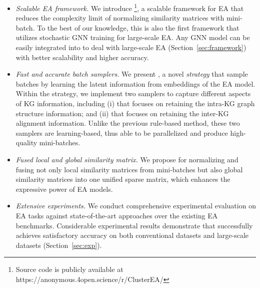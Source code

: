 \begin{itemize}[topsep=0pt,itemsep=0pt,parsep=0pt,partopsep=0pt,leftmargin=*]
    \item{\emph{Scalable EA framework.}}
    We introduce \ClusterEA{}\footnote{Source code is publicly available at https://anonymous.4open.science/r/ClusterEA/}, a scalable framework for EA that reduces the complexity limit of normalizing similarity matrices with mini-batch. To the best of our knowledge, this is also the first framework that utilizes stochastic GNN training for large-scale EA. Any GNN model can be easily integrated into \ClusterEA{} to deal with large-scale EA (Section~\ref{sec:framework}) with better scalability and higher accuracy.
    \item{\emph{Fast and accurate batch samplers.}}
    We present \Sampling{}, a novel \emph{strategy} that sample batches by learning the latent information from embeddings of the EA model. Within the strategy, we implement two samplers to capture different aspects of KG information, including
    (i) \MetisGCN{} that focuses on retaining the intra-KG graph structure information; and
    (ii) \KMeans{} that focuses on retaining the inter-KG alignment information. Unlike the previous rule-based method, these two samplers are learning-based, thus able to be parallelized and produce high-quality mini-batches.
    \item{\emph{Fused local and global similarity matrix.}} We propose \Merging{} for normalizing and fusing not only local similarity matrices from mini-batches but also global similarity matrices into one unified sparse matrix, which enhances the expressive power of EA models. 
    \item{\emph{Extensive experiments.}} We conduct comprehensive experimental evaluation on EA tasks against state-of-the-art approaches over the existing EA benchmarks. Considerable experimental results demonstrate that  \ClusterEA{} successfully achieves satisfactory accuracy on both conventional datasets and large-scale datasets (Section~\ref{sec:exp}).
\end{itemize}

